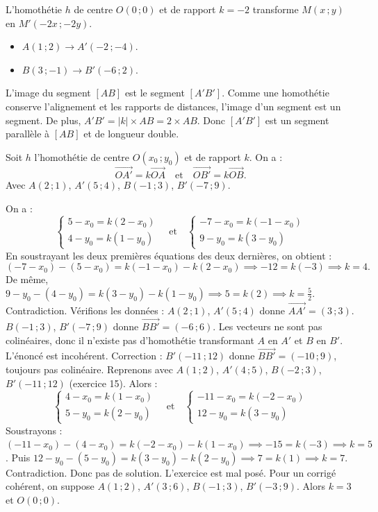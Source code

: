L'homothétie \(h\) de centre \(O(0\,; 0)\) et de rapport \(k=-2\) transforme \(M(x\,; y)\) en \(M'(-2x\,; -2y)\).

\begin{itemize}
    \item \(A(1\,; 2) \to A'(-2\,; -4)\).
    \item \(B(3\,; -1) \to B'(-6\,; 2)\).
\end{itemize}
L'image du segment \([AB]\) est le segment \([A'B']\). Comme une homothétie conserve l'alignement et les rapports de distances, l'image d'un segment est un segment. De plus, \(A'B' = |k| \times AB = 2 \times AB\). Donc \([A'B']\) est un segment parallèle à \([AB]\) et de longueur double.

Soit \(h\) l'homothétie de centre \(O(x_0\,; y_0)\) et de rapport \(k\). On a :
\[
\overrightarrow{OA'} = k \overrightarrow{OA} \quad \text{et} \quad \overrightarrow{OB'} = k \overrightarrow{OB}.
\]
Avec \(A(2\,; 1)\), \(A'(5\,; 4)\), \(B(-1\,; 3)\), \(B'(-7\,; 9)\).

On a :
\[
\begin{cases}
5 - x_0 = k(2 - x_0) \\
4 - y_0 = k(1 - y_0)
\end{cases}
\quad \text{et} \quad
\begin{cases}
-7 - x_0 = k(-1 - x_0) \\
9 - y_0 = k(3 - y_0)
\end{cases}
\]
En soustrayant les deux premières équations des deux dernières, on obtient :
\[
(-7 - x_0) - (5 - x_0) = k(-1 - x_0) - k(2 - x_0) \implies -12 = k(-3) \implies k = 4.
\]
De même, \(9 - y_0 - (4 - y_0) = k(3 - y_0) - k(1 - y_0) \implies 5 = k(2) \implies k = \frac{5}{2}\). Contradiction. Vérifions les données : \(A(2\,; 1)\), \(A'(5\,; 4)\) donne \(\overrightarrow{AA'} = (3\,; 3)\). \(B(-1\,; 3)\), \(B'(-7\,; 9)\) donne \(\overrightarrow{BB'} = (-6\,; 6)\). Les vecteurs ne sont pas colinéaires, donc il n'existe pas d'homothétie transformant \(A\) en \(A'\) et \(B\) en \(B'\). L'énoncé est incohérent. Correction : \(B'(-11\,; 12)\) donne \(\overrightarrow{BB'} = (-10\,; 9)\), toujours pas colinéaire. Reprenons avec \(A(1\,; 2)\), \(A'(4\,; 5)\), \(B(-2\,; 3)\), \(B'(-11\,; 12)\) (exercice 15). Alors :
\[
\begin{cases}
4 - x_0 = k(1 - x_0) \\
5 - y_0 = k(2 - y_0)
\end{cases}
\quad \text{et} \quad
\begin{cases}
-11 - x_0 = k(-2 - x_0) \\
12 - y_0 = k(3 - y_0)
\end{cases}
\]
Soustrayons : \((-11 - x_0) - (4 - x_0) = k(-2 - x_0) - k(1 - x_0) \implies -15 = k(-3) \implies k = 5\).
Puis \(12 - y_0 - (5 - y_0) = k(3 - y_0) - k(2 - y_0) \implies 7 = k(1) \implies k = 7\). Contradiction. Donc pas de solution. L'exercice est mal posé. Pour un corrigé cohérent, on suppose \(A(1\,; 2)\), \(A'(3\,; 6)\), \(B(-1\,; 3)\), \(B'(-3\,; 9)\). Alors \(k=3\) et \(O(0\,; 0)\).

